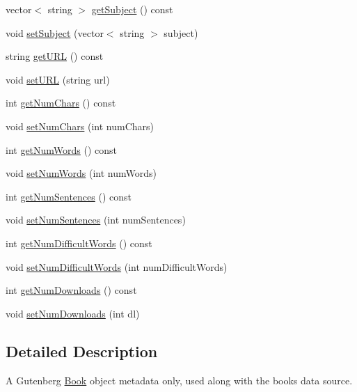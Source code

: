 \begin{DoxyCompactItemize}
vector$<$ string $>$ \hyperlink{classbridges_1_1_gutenberg_book_a9e5254871165856f457dc5a77a4793b3}{get\+Subject} () const 
\item 
void \hyperlink{classbridges_1_1_gutenberg_book_aa640bef3156b13c8ca510e0a280b1c5f}{set\+Subject} (vector$<$ string $>$ subject)
\item 
string \hyperlink{classbridges_1_1_gutenberg_book_ae9304e023bb07a121d314685dabdfdbb}{get\+U\+R\+L} () const 
\item 
void \hyperlink{classbridges_1_1_gutenberg_book_a4a5fa52c405170b57535cd0fcde5e3cf}{set\+U\+R\+L} (string url)
\item 
int \hyperlink{classbridges_1_1_gutenberg_book_a07e6ecfb667041bf7f99275a6cd8b45c}{get\+Num\+Chars} () const 
\item 
void \hyperlink{classbridges_1_1_gutenberg_book_a65cb7af6360e56a684e0606593846780}{set\+Num\+Chars} (int num\+Chars)
\item 
int \hyperlink{classbridges_1_1_gutenberg_book_aa3dd7b5eb28582d143e591a3dd236813}{get\+Num\+Words} () const 
\item 
void \hyperlink{classbridges_1_1_gutenberg_book_a34dafee1fb976f1da102d40f33a08ecf}{set\+Num\+Words} (int num\+Words)
\item 
int \hyperlink{classbridges_1_1_gutenberg_book_a0d727e984e4f62e9aa3ca5fd929d60c3}{get\+Num\+Sentences} () const 
\item 
void \hyperlink{classbridges_1_1_gutenberg_book_a368e71eaea48375104f172e0ae17527d}{set\+Num\+Sentences} (int num\+Sentences)
\item 
int \hyperlink{classbridges_1_1_gutenberg_book_a0a6c919d374203d7b4a07c94fedf0979}{get\+Num\+Difficult\+Words} () const 
\item 
void \hyperlink{classbridges_1_1_gutenberg_book_a4397cd3b9fd6113a1e72eb7671dd9d87}{set\+Num\+Difficult\+Words} (int num\+Difficult\+Words)
\item 
int \hyperlink{classbridges_1_1_gutenberg_book_a10fb0a20fb3731474d4d88639b853d9a}{get\+Num\+Downloads} () const 
\item 
void \hyperlink{classbridges_1_1_gutenberg_book_a6846dba9a5a78f360a0483b8685d79c1}{set\+Num\+Downloads} (int dl)
\end{DoxyCompactItemize}


\subsection{Detailed Description}
A Gutenberg \hyperlink{classbridges_1_1_book}{Book} object metadata only, used along with the books data source. 

